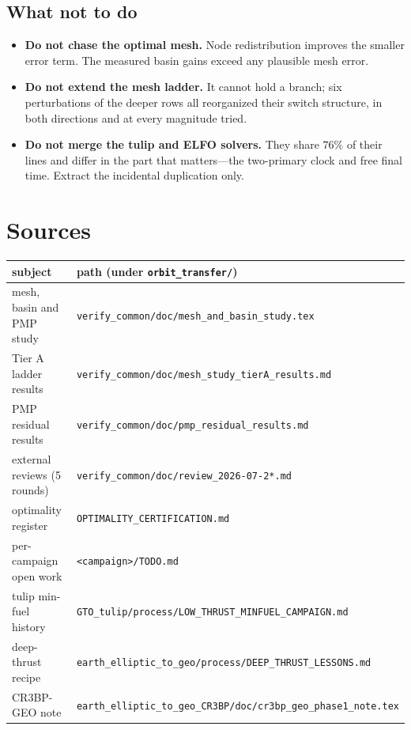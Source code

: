 \documentclass[11pt]{article}
\newcommand{\camp}[1]{\texttt{#1}}
\begin{document}
\subsection{What not to do}

\begin{itemize}
  \item \textbf{Do not chase the optimal mesh.} Node redistribution improves the
  smaller error term. The measured basin gains exceed any plausible mesh error.
  \item \textbf{Do not extend the mesh ladder.} It cannot hold a branch;
  six perturbations of the deeper rows all reorganized their switch structure,
  in both directions and at every magnitude tried.
  \item \textbf{Do not merge the tulip and ELFO solvers.} They share $76\%$ of
  their lines and differ in the part that matters---the two-primary clock and
  free final time. Extract the incidental duplication only.
\end{itemize}

\section*{Sources}

\begin{longtable}{ll}
\toprule
subject & path (under \camp{orbit\_transfer/}) \\
\midrule
\endhead
mesh, basin and PMP study & \camp{verify\_common/doc/mesh\_and\_basin\_study.tex} \\
Tier A ladder results & \camp{verify\_common/doc/mesh\_study\_tierA\_results.md} \\
PMP residual results & \camp{verify\_common/doc/pmp\_residual\_results.md} \\
external reviews (5 rounds) & \camp{verify\_common/doc/review\_2026-07-2*.md} \\
optimality register & \camp{OPTIMALITY\_CERTIFICATION.md} \\
per-campaign open work & \camp{<campaign>/TODO.md} \\
tulip min-fuel history & \camp{GTO\_tulip/process/LOW\_THRUST\_MINFUEL\_CAMPAIGN.md} \\
deep-thrust recipe & \camp{earth\_elliptic\_to\_geo/process/DEEP\_THRUST\_LESSONS.md} \\
CR3BP-GEO note & \camp{earth\_elliptic\_to\_geo\_CR3BP/doc/cr3bp\_geo\_phase1\_note.tex} \\
\bottomrule
\end{longtable}
\end{document}
